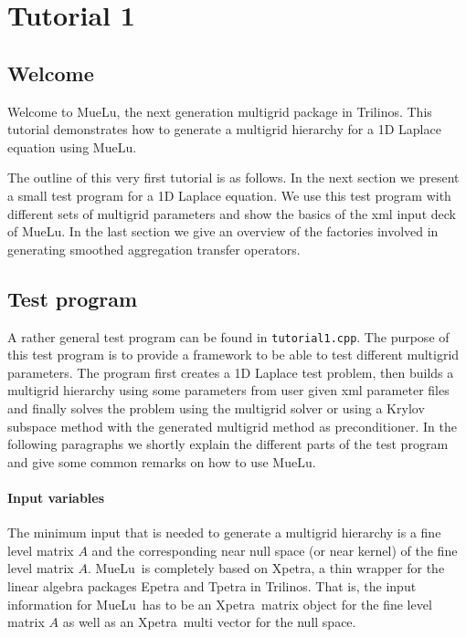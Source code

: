 \documentclass[12pt,a4paper]{article}
\author{Tobias Wiesner}
\newcommand{\MueLu}{MueLu}
\newcommand{\Xpetra}{Xpetra}
\begin{document}
\section{Tutorial 1}
\subsection{Welcome}
Welcome to \MueLu, the next generation multigrid package in Trilinos. This tutorial demonstrates how to generate a multigrid hierarchy for a 1D Laplace equation using MueLu.

The outline of this very first tutorial is as follows. In the next section we present a small test program for a 1D Laplace equation. We use this test program with different sets of multigrid parameters and show the basics of the xml input deck of \MueLu. In the last section we give an overview of the factories involved in generating smoothed aggregation transfer operators.

\subsection{Test program}
A rather general test program can be found in \texttt{tutorial1.cpp}. The purpose of this test program is to provide a framework to be able to test different multigrid parameters. The program first creates a 1D Laplace test problem, then builds a multigrid hierarchy using some parameters from user given xml parameter files and finally solves the problem using the multigrid solver or using a Krylov subspace method with the generated multigrid method as preconditioner. In the following paragraphs we shortly explain the different parts of the test program and give some common remarks on how to use \MueLu. 

\paragraph{Input variables}
The minimum input that is needed to generate a multigrid hierarchy is a fine level matrix $A$ and the corresponding near null space (or near kernel) of the fine level matrix $A$. \MueLu~is completely based on \Xpetra, a thin wrapper for the linear algebra packages Epetra and Tpetra in Trilinos. That is, the input information for \MueLu~has to be an \Xpetra~matrix object for the fine level matrix $A$ as well as an \Xpetra~multi vector for the null space.
\end{document}
